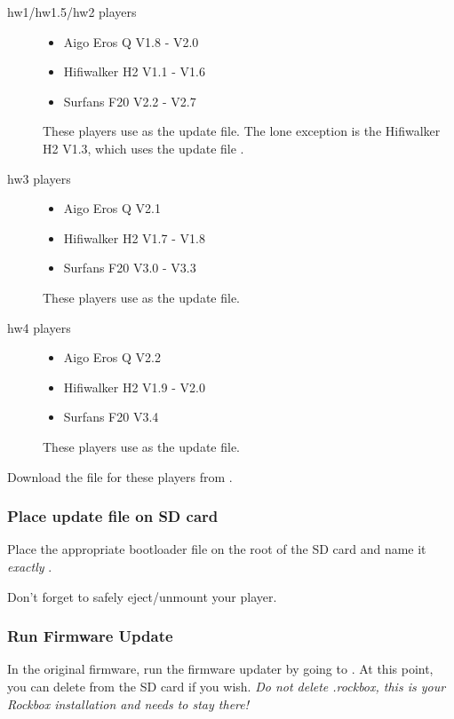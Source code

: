 \begin{description}
\item[hw1/hw1.5/hw2 players]
  \begin{itemize}
    \item Aigo Eros Q V1.8 - V2.0
    \item Hifiwalker H2 V1.1 - V1.6
    \item Surfans F20 V2.2 - V2.7
  \end{itemize}
  These players use  as the update file.
  The lone exception is the Hifiwalker H2 V1.3, which uses the update file
  .
\item[hw3 players]
  \begin{itemize}
    \item Aigo Eros Q V2.1
    \item Hifiwalker H2 V1.7 - V1.8
    \item Surfans F20 V3.0 - V3.3
  \end{itemize}
  These players use  as the update file.
\item[hw4 players]
  \begin{itemize}
    \item Aigo Eros Q V2.2
    \item Hifiwalker H2 V1.9 - V2.0
    \item Surfans F20 V3.4
  \end{itemize}
  These players use  as the update file.
\end{description}

Download the  file for these players from .


\subsubsection{Place update file on SD card}\label{ref:place_on_sd_card}
Place the appropriate bootloader file on the root of the SD card and name it
\emph{exactly} .


Don't forget to safely eject/unmount your player.

\subsubsection{Run Firmware Update}\label{ref:run_firmware_update}
In the original firmware, run the firmware updater by going to
. At this point, you can delete
 from the SD card if you wish. \emph{Do not delete .rockbox,
this is your Rockbox installation and needs to stay there!}
